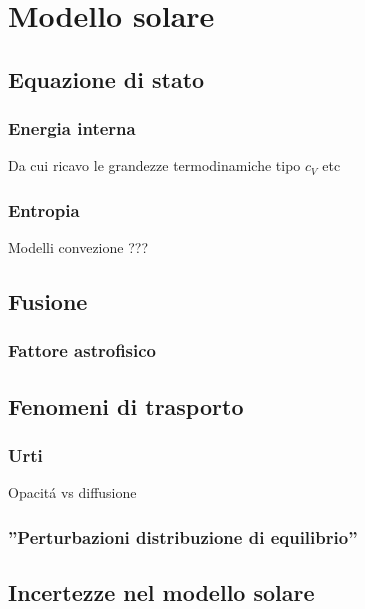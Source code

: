 \documentclass[../main.tex]{subfiles}
\begin{document}
\chapter{Modello solare}

\begin{refsection}
\nocite{*}
\begingroup
\let\clearpage\relax
\printbibliography
\endgroup

\section{Equazione di stato}

\subsection{Energia interna}

Da cui ricavo le grandezze termodinamiche tipo $c_V$ etc

\subsection{Entropia}

Modelli convezione ???

\section{Fusione}

\subsection{Fattore astrofisico}

\section{Fenomeni di trasporto}

\subsection{Urti}

Opacit\'a vs diffusione

\subsection{''Perturbazioni distribuzione di equilibrio''}


\section{Incertezze nel modello solare}


\end{refsection}
\end{document}
